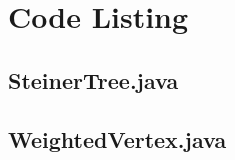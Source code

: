 \documentclass[12pt]{article}
\begin{document}
\section{Code Listing}
\subsection*{SteinerTree.java}
\lstset{basicstyle=\ttfamily\scriptsize, language=java}

\pagebreak
\subsection*{WeightedVertex.java}

\end{document}
